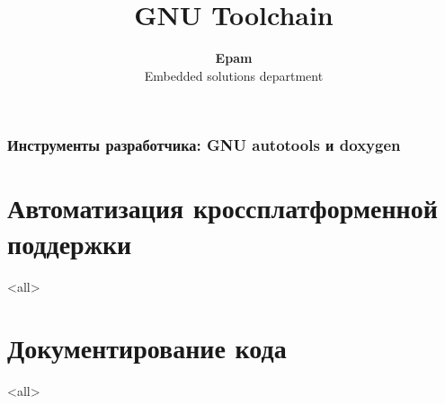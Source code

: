 \documentclass[ignorenonframetext, professionalfonts, hyperref={pdftex, unicode}]{beamer}
\title[toolchain]{GNU Toolchain}
\author[Epam]{{\bf Epam}\\Embedded solutions department}
\begin{document}



\begin{frame}
	\frametitle{Инструменты разработчика: GNU autotools и doxygen}
	\titlepage
	\vspace{-0.5cm}
	\begin{center}
	\end{center}
\end{frame}

\begin{frame}
	\tableofcontents
\end{frame}



\section{Автоматизация кроссплатформенной поддержки}

\mode<all>{}

\section{Документирование кода}

\mode<all>{}
\end{document}
